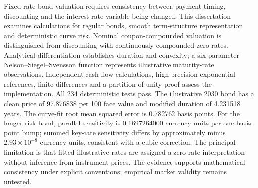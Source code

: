 Fixed-rate bond valuation requires consistency between payment timing, discounting and the interest-rate variable being changed. This dissertation examines calculations for regular bonds, smooth term-structure representation and deterministic curve risk. Nominal coupon-compounded valuation is distinguished from discounting with continuously compounded zero rates. Analytical differentiation establishes duration and convexity; a six-parameter Nelson--Siegel--Svensson function represents illustrative maturity-rate observations. Independent cash-flow calculations, high-precision exponential references, finite differences and a partition-of-unity proof assess the implementation. All 234 deterministic tests pass. The illustrative 2030 bond has a clean price of 97.876838 per 100 face value and modified duration of 4.231518 years. The curve-fit root mean squared error is 0.782762 basis points. For the longer risk bond, parallel sensitivity is 0.1697264000 currency units per one-basis-point bump; summed key-rate sensitivity differs by approximately minus \(2.93\times10^{-8}\) currency units, consistent with a cubic correction. The principal limitation is that fitted illustrative rates are assigned a zero-rate interpretation without inference from instrument prices. The evidence supports mathematical consistency under explicit conventions; empirical market validity remains untested.

